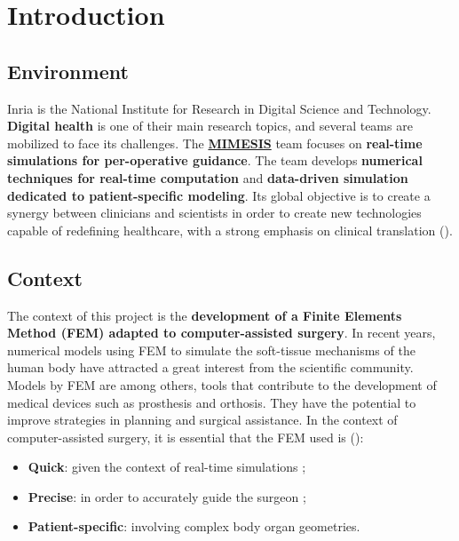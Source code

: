 
\chapter{Introduction} %

\label{Chapter1} %


\newcommand{\keyword}[1]{\textbf{#1}}
\newcommand{\tabhead}[1]{\textbf{#1}}
\newcommand{\code}[1]{\texttt{#1}}
\newcommand{\file}[1]{\texttt{\bfseries#1}}
\newcommand{\option}[1]{\texttt{\itshape#1}}


\section{Environment} %


\indent Inria is the National Institute for Research in Digital Science and Technology. \textbf{Digital health} is one of their main research topics, and several teams are mobilized to face its challenges. The \textbf{\href{https://mimesis.inria.fr/}{MIMESIS}} team focuses on \textbf{real-time simulations for per-operative guidance}. The team develops \textbf {numerical techniques for real-time computation} and \textbf{data-driven simulation dedicated to patient-specific modeling}. Its global objective is to create a synergy between clinicians and scientists in order to create new technologies capable of redefining healthcare, with a strong emphasis on clinical translation (\cite{Reference1}).


\section{Context} %

The context of this project is the \textbf{development of a Finite Elements Method (FEM) adapted to computer-assisted surgery}. In recent years, numerical models using FEM to simulate the soft-tissue mechanisms of the human body have attracted a great interest from the scientific community. Models by FEM are among others, tools that contribute to the development of medical devices such as prosthesis and orthosis. They have the potential to improve strategies in planning and surgical assistance. In the context of computer-assisted surgery, it is essential that the FEM used is (\cite{Reference2}): 
\begin{itemize}
    \item \textbf{Quick}: given the context of real-time simulations ; 
    \item \textbf{Precise}: in order to accurately guide the surgeon ;
    \item \textbf{Patient-specific}: involving complex body organ geometries.
\end{itemize}


